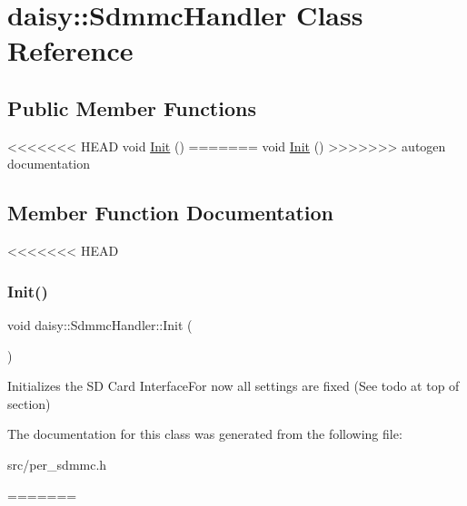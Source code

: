 \hypertarget{classdaisy_1_1_sdmmc_handler}{}\section{daisy\+:\+:Sdmmc\+Handler Class Reference}
\label{classdaisy_1_1_sdmmc_handler}
\subsection*{Public Member Functions}
\begin{DoxyCompactItemize}
\item 
<<<<<<< HEAD
void \hyperlink{classdaisy_1_1_sdmmc_handler_a64c804e0bab704e971660d605839555c}{Init} ()
=======
void \hyperlink{classdaisy_1_1_sdmmc_handler_a755d09dd70ce39b8c9826d531971e63d}{Init} ()
>>>>>>> autogen documentation
\end{DoxyCompactItemize}


\subsection{Member Function Documentation}
<<<<<<< HEAD
\mbox{\label{classdaisy_1_1_sdmmc_handler_a64c804e0bab704e971660d605839555c}} 
\subsubsection{\texorpdfstring{Init()}{Init()}}
{\footnotesize\ttfamily void daisy\+::\+Sdmmc\+Handler\+::\+Init (\begin{DoxyParamCaption}{ }\end{DoxyParamCaption})}

Initializes the SD Card Interface\+For now all settings are fixed (See todo at top of section) 

The documentation for this class was generated from the following file\+:\begin{DoxyCompactItemize}
\item 
src/per\+\_\+sdmmc.\+h\end{DoxyCompactItemize}
=======
\mbox{\label{classdaisy_1_1_sdmmc_handler_a755d09dd70ce39b8c9826d531971e63d}} 
